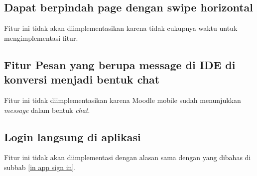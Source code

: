 \subsection{Dapat berpindah page dengan swipe horizontal}
 \label{horizontal swipe}
 Fitur ini tidak akan diimplementasikan karena tidak cukupnya waktu untuk mengimplementasi fitur.

\subsection{Fitur Pesan yang berupa message di IDE di konversi menjadi bentuk chat }
\label{chat}
Fitur ini tidak diimplementasikan karena Moodle mobile sudah menunjukkan \textit{message} dalam bentuk \textit{chat}.

\subsection{Login langsung di aplikasi}
 \label{in app login}
Fitur ini tidak akan diimplementasi dengan alasan sama dengan yang dibahas di subbab \ref{in app sign in}.

